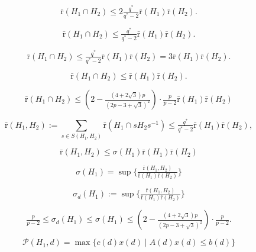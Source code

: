 \documentclass[10pt, reqno]{article}
\begin{document}
\begin{equation}\label{di}
\bar {\mathrm{r}}(H_1\cap H_2)  \le  2\tfrac{q^*}{q^*-2}
 \bar {\mathrm{r}}(H_1) \bar {\mathrm{r}}(H_2)  .
\end{equation}

\begin{equation}\label{conj}
 \bar {\mathrm{r}}(H_1\cap H_2)  \le  \tfrac{q^*}{q^*-2}
 \bar {\mathrm{r}}(H_1) \bar {\mathrm{r}}(H_2)  .
 \end{equation}

$$
\bar {\mathrm{r}}(H_1\cap H_2)  \le  \tfrac{q^*}{q^*-2}  \bar {\mathrm{r}}(H_1) \bar {\mathrm{r}}(H_2) = 3  \bar {\mathrm{r}}(H_1) \bar {\mathrm{r}}(H_2) .
$$

\begin{equation}\label{HNC}
\bar {\mathrm{r}}(H_1\cap H_2)  \le   \bar {\mathrm{r}}(H_1) \bar {\mathrm{r}}(H_2) .
 \end{equation}

\begin{equation}\label{imrn}
  \bar {\mathrm{r}}(H_1\cap H_2)  \le   \left(2 - \tfrac{(4+2\sqrt{3})p}{(2p-3+\sqrt{3})^2} \right) \cdot \tfrac{p}{p-2}  \bar {\mathrm{r}}(H_1) \bar {\mathrm{r}}(H_2)
 \end{equation}

\begin{equation}\label{conjs}
\bar {\mathrm{r}}(H_1, H_2) :=   \sum_{s \in S(H_1, H_2)} \bar {\mathrm{r}}(H_1\cap s H_2 s^{-1})
\le \tfrac{q^*}{q^*-2}   \bar {\mathrm{r}}(H_1) \bar {\mathrm{r}}(H_2)  ,
\end{equation}

\begin{equation}\label{dfy0}
{\bar {\mathrm{r}}} (H_1 , H_2) \le \sigma(H_1)  {\bar {\mathrm{r}}}(H_1) {\bar {\mathrm{r}}}(H_2)
\end{equation}

$$
\sigma(H_1)  = \sup \{ \tfrac{{\bar {\mathrm{r}}} (H_1,  H_2)}{{\bar {\mathrm{r}}} (H_1) {\bar {\mathrm{r}}} (H_2) } \}
$$

\begin{equation}\label{dfy0d}
\sigma_d(H_1)  := \sup \{ \tfrac{{\bar {\mathrm{r}}} (H_1 ,  H_2)}{{\bar {\mathrm{r}}} (H_1) {\bar {\mathrm{r}}} (H_2) } \}
\end{equation}

$$
\tfrac{p}{p-2} \le   \sigma_d(H_1)\le \sigma(H_1)  \le   \left(2 - \tfrac{(4+2\sqrt{3})p}{(2p-3+\sqrt{3})^2} \right) \cdot \tfrac{p}{p-2} .
$$

\begin{equation}\label{lpa}
{\mathcal{P}}(H_1, d) = \max\{ c(d)x(d) \mid A(d)x(d) \le b(d)  \}
\end{equation}
\end{document}
